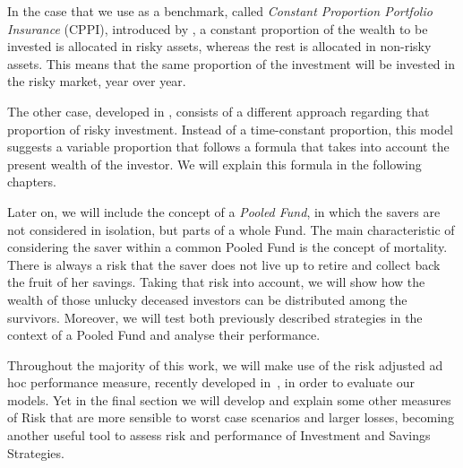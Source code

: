 In the case that we use as a benchmark, called \textit{Constant Proportion Portfolio Insurance} (CPPI), introduced by \cite{a:perold-constant}, a constant proportion of the wealth to be invested is allocated in risky assets, whereas the rest is allocated in non-risky assets. This means that the same proportion of the investment will be invested in the risky market, year over year.

The other case, developed in \cite{a:guillen-optimisation}, consists of a different approach regarding that proportion of risky investment. Instead of a time-constant proportion, this model suggests a variable proportion that follows a formula that takes into account the present wealth of the investor. We will explain this formula in the following chapters.

Later on, we will include the concept of a \emph{Pooled Fund}, in which the savers are not considered in isolation, but parts of a whole Fund. The main characteristic of considering the saver within a common Pooled Fund is the concept of mortality. There is always a risk that the saver does not live up to retire and collect back the fruit of her savings. Taking that risk into account, we will show how the wealth of those unlucky deceased investors can be distributed among the survivors. Moreover, we will test both previously described strategies in the context of a Pooled Fund and analyse their performance.

Throughout the majority of this work, we will make use of the risk adjusted ad hoc performance measure, recently developed in~\cite{a:guillen-performance, a:guillen-guarantee}, in order to evaluate our models. Yet in the final section we will develop and explain some other measures of Risk that are more sensible to worst case scenarios and larger losses, becoming another useful tool to assess risk and performance of Investment and Savings Strategies.
